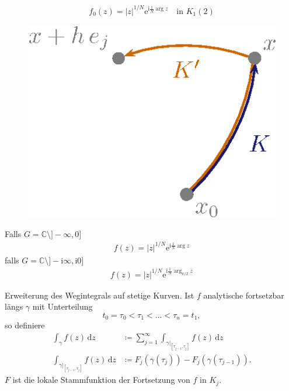\documentclass[a4paper,10pt]{scrbook}
\begin{document}
\begin{example}
  \begin{align*}
    f_0(z) = |z|^{1/N} \mathrm{e}^{\mathrm{i}\frac{1}{N}\arg z} \quad \text{in } K_1(2)
  \end{align*}
  \begin{figure}[H]
    \centering
    \includegraphics[scale=0.2]{images/ana3-tmp-49}
  \end{figure}
  Falls $G = \mathbb{C} \setminus ]-\infty,0]$
  \begin{align*}
    f(z) = |z|^{1/N} \mathrm{e}^{\mathrm{i}\frac{1}{N}\arg z}
  \end{align*}
  falls $G = \mathbb{C} \setminus ]-\mathrm{i} \infty,\mathrm{i} 0]$
  \begin{align*}
    f(z) = |z|^{1/N} \mathrm{e}^{\mathrm{i}\frac{1}{N}\arg_{\pi/2} z}
  \end{align*}
\end{example}

\begin{notice}[Ausblick]
  Erweiterung des Wegintegrals auf stetige Kurven. Ist $f$ analytische fortsetzbar längs $\gamma$ mit Unterteilung \[ t_0 = \tau_0 < \tau_1 < \ldots < \tau_n = t_1 , \] so definiere
  \begin{align*}
    \int_\gamma f(z) \, \mathrm{d}z &\coloneq \sum\limits_{j=1}^{\infty} \int_{\gamma|_{[\tau_{j-1},\tau_j]}} f(z) \, \mathrm{d}z \\
    \int_{\gamma|_{[\tau_{j-1},\tau_j]}} f(z) \, \mathrm{d}z &\coloneq F_j(\gamma(\tau_j)) - F_j(\gamma(\tau_{j-1})).
  \end{align*}
  $F$ ist die lokale Stammfunktion der Fortsetzung von $f$ in $K_j$.
\end{notice}
\end{document}
